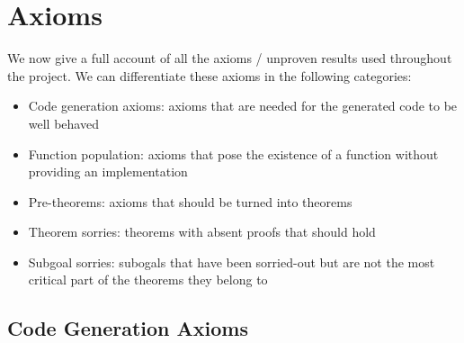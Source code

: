 \chapter{Axioms}

We now give a full account of all the axioms / unproven results used
throughout the project.
We can differentiate these axioms in the following categories:

\begin{itemize}
\item Code generation axioms: axioms that are needed for the generated code to be well
  behaved
\item Function population: axioms that pose the existence of a function without
  providing an implementation
\item Pre-theorems: axioms that should be turned into theorems
\item Theorem sorries: theorems with absent proofs that should hold
\item Subgoal sorries: subogals that have been sorried-out but are not the most
  critical part of the theorems they belong to
\end{itemize}

\section{Code Generation Axioms}
